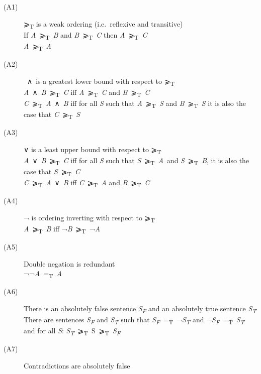 \documentclass[
  10pt,
  letterpaper,
  DIV=11,
  numbers=noendperiod,
  twoside]{scrartcl}
\begin{document}
\begin{description}
\item[(A1)]
⩾\textsubscript{T} is a weak ordering (i.e.~reflexive and transitive)\\
If \emph{A}~⩾\textsubscript{T}~\emph{B} and
\emph{B}~⩾\textsubscript{T}~\emph{C} then
\emph{A}~⩾\textsubscript{T}~\emph{C}\\
\emph{A}~⩾\textsubscript{T}~\emph{A}
\item[(A2)]
~∧~is a greatest lower bound with respect to ⩾\textsubscript{T}\\
\emph{A}~∧~\emph{B}~⩾\textsubscript{T}~\emph{C} iff
\emph{A}~⩾\textsubscript{T}~\emph{C} and
\emph{B}~⩾\textsubscript{T}~\emph{C}\\
\emph{C}~⩾\textsubscript{T}~\emph{A}~∧~\emph{B} iff for all \emph{S}
such that \emph{A}~⩾\textsubscript{T}~\emph{S} and
\emph{B}~⩾\textsubscript{T}~\emph{S} it is also the case that
\emph{C}~⩾\textsubscript{T}~\emph{S}
\item[(A3)]
∨ is a least upper bound with respect to ⩾\textsubscript{T}\\
\emph{A}~∨~\emph{B}~⩾\textsubscript{T}~\emph{C} iff for all \emph{S}
such that \emph{S}~⩾\textsubscript{T}~\emph{A}~and
\emph{S}~⩾\textsubscript{T}~\emph{B}, it is also the case that
\emph{S}~⩾\textsubscript{T}~\emph{C}\\
\emph{C}~⩾\textsubscript{T}~\emph{A}~∨~\emph{B} iff
\emph{C}~⩾\textsubscript{T}~\emph{A} and
\emph{B}~⩾\textsubscript{T}~\emph{C}
\item[(A4)]
¬ is ordering inverting with respect to ⩾\textsubscript{T}\\
\emph{A}~⩾\textsubscript{T}~\emph{B} iff
¬\emph{B}~⩾\textsubscript{T}~¬\emph{A}
\item[(A5)]
Double negation is redundant\\
¬¬\emph{A}~=\textsubscript{T}~\emph{A}
\item[(A6)]
There is an absolutely false sentence \emph{S\textsubscript{F}} and an
absolutely true sentence \emph{S\textsubscript{T}}\\
There are sentences \emph{S\textsubscript{F}} and
\emph{S\textsubscript{T}} such that
\emph{S\textsubscript{F}}~=\textsubscript{T}~¬\emph{S\textsubscript{T}}
and
¬\emph{S\textsubscript{F}}~=\textsubscript{T}~\emph{S\textsubscript{T}}
and for all \emph{S}:
\emph{S\textsubscript{T}}~⩾\textsubscript{T}~S~⩾\textsubscript{T}~\emph{S\textsubscript{F}}
\item[(A7)]
Contradictions are absolutely false\\

\end{description}
\end{document}
